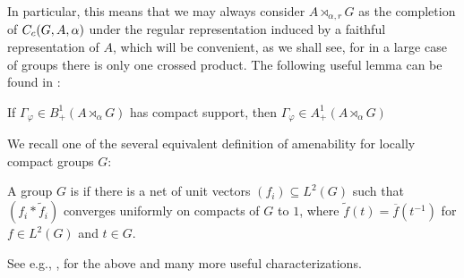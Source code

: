 In particular, this means that we may always consider $A \rtimes_{\alpha,r}G$ as the completion of $C_c(G,A,\alpha)$ under the regular representation induced by a faithful representation of $A$, which will be convenient, as we shall see, for in a large case of groups there is only one crossed product. The following useful lemma can be found in \cite[Lemma 7.7.6]{pedersenalgauto}:
\begin{lemma}
If $\Gamma_\varphi \in B_+^1(A \rtimes_\alpha G)$ has compact support, then $\Gamma_\varphi \in A_+^1(A \rtimes_\alpha G)$
\label{crossed:compactposdef}
\end{lemma}

We recall one of the several equivalent definition of amenability for locally compact groups $G$:
\begin{definition}
A group $G$ is  if there is a net of unit vectors $(f_i) \subseteq L^2(G)$ such that $(f_i \ast \tilde f_i)$ converges uniformly on compacts of $G$ to $1$, where $\tilde f (t) = \overline f(t^{-1})$ for $f \in L^2(G)$ and $t \in G$.
\end{definition}
See e.g., \cite[Appendix G]{bekka2008kazhdan}, \cite[Proposition 7.3.7 and 7.3.8]{pedersenalgauto} for the above and many more useful characterizations. 

